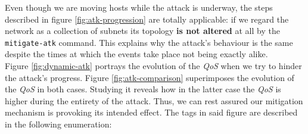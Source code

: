             Even though we are moving hosts while the attack is underway, the steps described in figure \ref{fig:atk-progression} are totally applicable: if we regard the network as a collection of subnets its topology \textbf{is not altered} at all by the \texttt{mitigate-atk} command. This explains why the attack's behaviour is the same despite the times at which the events take place not being exactly alike.\\

            Figure \ref{fig:dynamic-atk} portrays the evolution of the \textit{QoS} when we try to hinder the attack's progress. Figure \ref{fig:atk-comparison} superimposes the evolution of the \textit{QoS} in both cases. Studying it reveals how in the latter case the \textit{QoS} is higher during the entirety of the attack. Thus, we can rest assured our mitigation mechanism is provoking its intended effect. The tags in said figure are described in the following enumeration:\\

